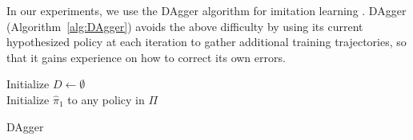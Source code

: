 \documentclass[twoside,11pt]{article}
\begin{document}
In our experiments, we use the DAgger algorithm for imitation learning \citep{DAgger}.  DAgger (Algorithm~\ref{alg:DAgger}) avoids the above difficulty by using its current hypothesized policy at each iteration to gather additional training trajectories, so that it gains experience on how to correct its own errors.
%
%


\begin{algorithm}[htb]
 Initialize $D \leftarrow \emptyset$ \\
 Initialize $\hat{\pi}_1$ to any policy in $\Pi$ \\
 \caption{DAgger}
 \label{alg:DAgger}
\end{algorithm}
\end{document}
